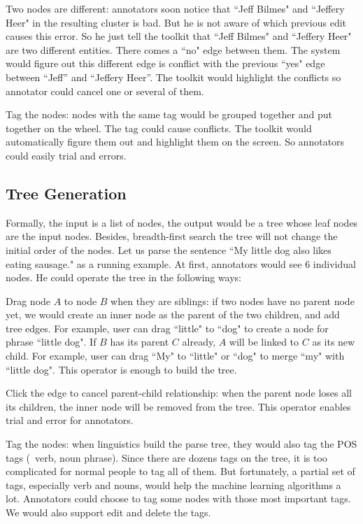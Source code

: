 Two nodes are different: annotators soon notice that ``Jeff Bilmes"
and ``Jeffery Heer" in the resulting cluster is bad. But he is not
aware of which previous edit causes this error. So he just tell the
toolkit that ``Jeff Bilmes" and ``Jeffery Heer" are two different
entities. There comes a ``no" edge between them. The system would
figure out this different edge is conflict with the previous ``yes"
edge between ``Jeff'' and ``Jeffery Heer''. The toolkit would
highlight the conflicts so annotator could cancel one or several of
them.

Tag the nodes: nodes with the same tag would be grouped together and
put together on the wheel. The tag could cause conflicts. The toolkit
would automatically figure them out and highlight them on the screen.
So annotators could easily trial and errors. 


\subsection{Tree Generation}

Formally, the input is a list of nodes, the output would be a tree
whose leaf nodes are the input nodes. Besides, breadth-first search
the tree will not change the initial order of the nodes. Let us parse
the sentence ``My little dog also likes eating sausage." as a running
example. At first, annotators would see 6 individual nodes. He could
operate the tree in the following ways: 

Drag node $A$ to node $B$ when they are siblings: if two nodes have no
parent node yet, we would create an inner node as the parent of the
two children, and add tree edges. For example, user can drag ``little"
to ``dog" to create a node for phrase ``little dog". If $B$ has its
parent $C$ already, $A$ will be linked to $C$ as its new child. For
example, user can drag ``My" to ``little" or ``dog" to merge ``my"
with ``little dog". This operator is enough to build the tree.

Click the edge to cancel parent-child relationship: when the parent
node loses all its children, the inner node will be removed from the
tree. This operator enables trial and error for annotators. 

Tag the nodes: when linguistics build the parse tree, they would also
tag the POS tags (\ie\ verb, noun phrase). Since there are dozens tags
on the tree, it is too complicated for normal people to tag all of
them. But fortunately, a partial set of tags, especially verb and
nouns, would help the machine learning algorithms a lot. Annotators
could choose to tag some nodes with those most important tags. We
would also support edit and delete the tags. 



